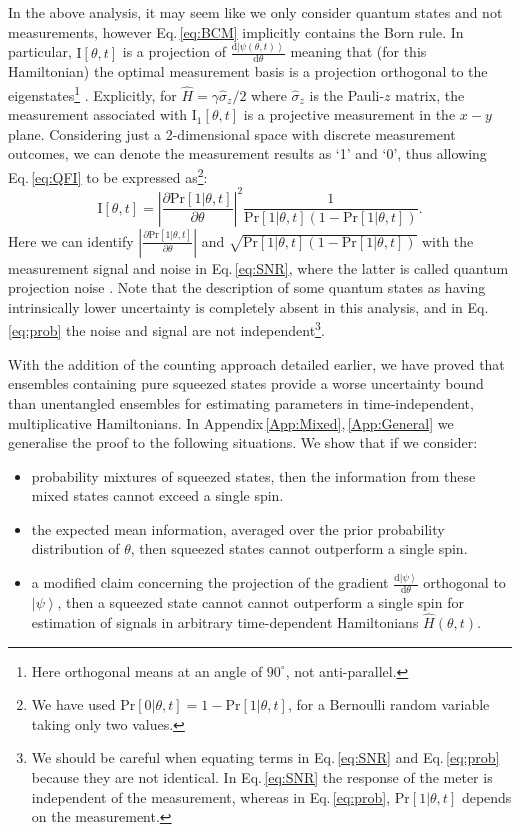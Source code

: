 \documentclass[reqno]{amsart}
\def\be{\begin{equation}}
\def\ee{\end{equation}}
\newcommand{\ket}[1]{\left| #1 \right>}
\newcommand{\hham}{\hat{H}}
\def\func#1#2{\mathrm{#1}\left[#2\right]}
\def\funcwrt#1#2#3{\mathrm{#1}_{\mathrm{#3}}\left[#2\right]}
\begin{document}
In the above analysis, it may seem like we only consider quantum states and not measurements, however Eq.\,\eqref{eq:BCM} implicitly contains the Born rule. In particular, $\func{I}{\theta,t}$ is a projection of $\frac{\mathrm{d}\ket{\psi(\theta,t)}}{\mathrm{d} \theta}$ meaning that (for this Hamiltonian) the optimal measurement basis is a projection orthogonal to the eigenstates\footnote{Here orthogonal means at an angle of $90^{\circ}$, not anti-parallel.} \cite{Braunstein1996, Childs2000, Giovannetti2004, Pang2017}. Explicitly, for $\hham = \gamma \hat{\sigma}_z/2$ where $\hat{\sigma}_z$ is the Pauli-$z$ matrix, the measurement associated with $\funcwrt{I}{\theta,t}{1}$ is a projective measurement in the $x-y$ plane. Considering just a 2-dimensional space with discrete measurement outcomes, we can denote the measurement results as `1' and `0', thus allowing Eq.\,\eqref{eq:QFI} to be expressed as\footnote{We have used $\func{Pr}{0|\theta,t} = 1 - \func{Pr}{1|\theta,t}$, for a Bernoulli random variable taking only two values.}:
\be
\func{I}{\theta,t} = \left|\frac{\partial \func{Pr}{1|\theta,t}}{\partial \theta}\right|^{2} \frac{1}{\func{Pr}{1|\theta,t}\left(1-\func{Pr}{1|\theta,t}\right)}.
\label{eq:prob}
\ee
Here we can identify $\left|\frac{\partial \func{Pr}{1|\theta,t}}{\partial \theta}\right|$ and $\sqrt{\func{Pr}{1|\theta,t}\left(1-\func{Pr}{1|\theta,t}\right)}$ with the measurement signal and noise in Eq.\,\eqref{eq:SNR}, where the latter is called quantum projection noise \cite{Itano1993}. Note that the description of some quantum states as having intrinsically lower uncertainty is completely absent in this analysis, and in Eq.\,\eqref{eq:prob} the noise and signal are not independent\footnote{We should be careful when equating terms in Eq.\,\eqref{eq:SNR} and Eq.\,\eqref{eq:prob} because they are not identical. In Eq.\,\eqref{eq:SNR} the response of the meter is independent of the measurement, whereas in Eq.\,\eqref{eq:prob}, $\func{Pr}{1|\theta,t}$ depends on the measurement.}.

With the addition of the counting approach detailed earlier, we have proved that ensembles containing pure squeezed states provide a worse uncertainty bound than unentangled ensembles for estimating parameters in time-independent, multiplicative Hamiltonians. In Appendix\,\ref{App:Mixed},\,\ref{App:General} we generalise the proof to the following situations. We show that if we consider:
\begin{itemize}
\item probability mixtures of squeezed states, then the information from these mixed states cannot exceed a single spin.
\item the expected mean information, averaged over the prior probability distribution of $\theta$, then squeezed states cannot outperform a single spin.
\item a modified claim concerning the projection of the gradient $\frac{\mathrm{d} \ket{\psi}}{\mathrm{d}\theta}$ orthogonal to $\ket{\psi}$, then a squeezed state cannot cannot outperform a single spin for estimation of signals in arbitrary time-dependent Hamiltonians $\hham(\theta, t)$.
\end{itemize}
\end{document}
